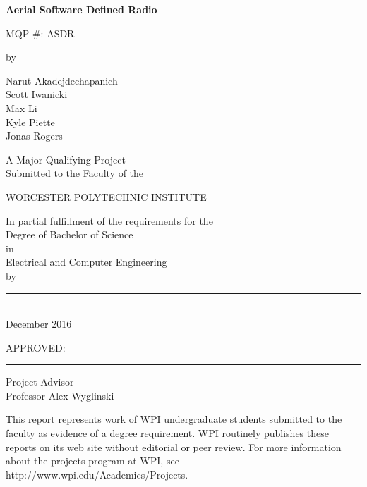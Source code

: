 \documentclass[12pt]{report}
\begin{document}
	
	
	
	\newcommand{\brk}{\vspace*{0.18in}}
	
	\thispagestyle{empty}
	
	\begin{center}
		
		\brk
		
		
		{\large 
			\textbf{
				Aerial Software Defined Radio
			}
		}
		
		MQP \#: ASDR
		
		\brk
		by
		
		\brk
		Narut Akadejdechapanich\\Scott Iwanicki\\Max Li\\Kyle Piette\\Jonas Rogers
		
		\brk\brk
		A Major Qualifying Project\\
		Submitted to the Faculty of the 
		
		\brk
		WORCESTER POLYTECHNIC INSTITUTE
		
		\brk
		In partial fulfillment of the requirements for the\\
		Degree of Bachelor of Science\\
		in\\
		Electrical and Computer Engineering\\
		by
		
		\brk\brk
		\rule{3in}{1.2pt}\\
		December 2016
		
	\end{center}
	
	
	APPROVED:
	
	\vspace{0.5in}
	\rule{3in}{0.8pt}
	Project Advisor \\
	Professor Alex Wyglinski
	\begin{center}
	This report represents work of WPI undergraduate students submitted to the faculty as evidence of a degree requirement. WPI routinely publishes these reports on its web site without editorial or peer review. For more information about the projects program at WPI, see http://www.wpi.edu/Academics/Projects.
	\end{center}
	
\end{document}
